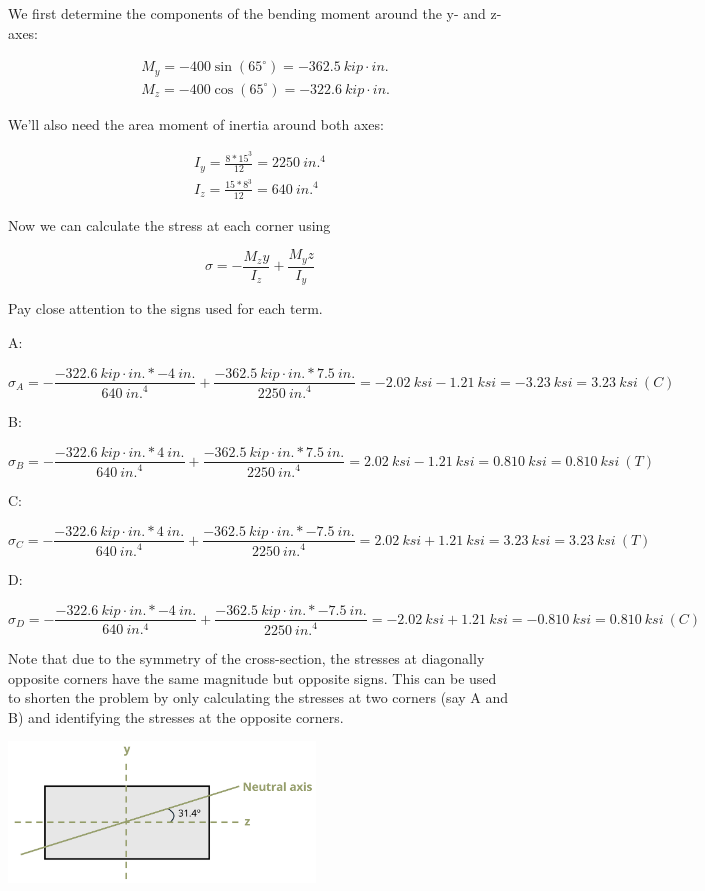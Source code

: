 \documentclass[
  letterpaper,
  DIV=11,
  numbers=noendperiod]{scrreprt}
\theoremstyle{definition}
\theoremstyle{remark}
\begin{document}
\begin{tcolorbox}
\begin{tcolorbox}
We first determine the components of the bending moment around the y-
and z-axes:

\[
\begin{aligned}
& M_y=-400 \sin(65^{\circ})=-362.5{~kip}\cdot{in.} \\
& M_z=-400 \cos(65^{\circ})=-322.6{~kip}\cdot{in.}
\end{aligned}
\]

We'll also need the area moment of inertia around both axes:

\[
\begin{gathered}
I_y=\frac{8 * 15^3}{12}=2250{~in.}^4 \\
I_z=\frac{15 * 8^3}{12}=640{~in.}^4
\end{gathered}
\]

Now we can calculate the stress at each corner using

\[
\sigma=-\frac{M_z y}{I_z}+\frac{M_y z}{I_y}
\]

Pay close attention to the signs used for each term.

A:

\[
\sigma_A=-\frac{-322.6{~kip}\cdot{in.} *-4{~in.}}{640{~in.}^4}+\frac{-362.5{~kip}\cdot{in.} * 7.5{~in.}}{2250{~in.}^4}=-2.02{~ksi}-1.21{~ksi}=-3.23{~ksi}=3.23{~ksi}~(C)
\]

B:

\[
\sigma_B=-\frac{-322.6{~kip}\cdot{in.} * 4{~in.}}{640{~in.}^4}+\frac{-362.5{~kip}\cdot{in.} * 7.5{~in.}}{2250{~in.}^4}=2.02{~ksi}-1.21{~ksi}=0.810{~ksi}=0.810{~ksi }~(T)
\]

C:

\[
\sigma_C=-\frac{-322.6{~kip}\cdot{in.} * 4{~in.}}{640{~in.}^4}+\frac{-362.5{~kip}\cdot{in.} *-7.5{~in.}}{2250{~in.}^4}=2.02{~ksi}+1.21{~ksi}=3.23{~ksi}=3.23{~ksi}~(T)
\]

D:

\[
\sigma_D=-\frac{-322.6{~kip}\cdot{in.} *-4{~in.}}{640{~in.^4}}+\frac{-362.5{~kip}\cdot{in.} *-7.5{~in.}}{2250{~in.}^4}=-2.02{~ksi}+1.21{~ksi}=-0.810{~ksi}=0.810{~ksi}~(C)
\]

Note that due to the symmetry of the cross-section, the stresses at
diagonally opposite corners have the same magnitude but opposite signs.
This can be used to shorten the problem by only calculating the stresses
at two corners (say A and B) and identifying the stresses at the
opposite corners.

\begin{center}
\includegraphics[width=3.20833in,height=\textheight]{images/CH9 PNGs/Example 9.5 part 2.png}
\end{center}


\end{tcolorbox}
\end{tcolorbox}
\end{document}
